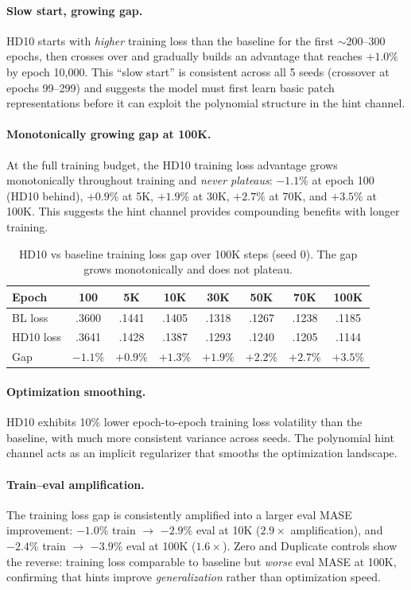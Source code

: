 \documentclass{article}
\begin{document}
\paragraph{Slow start, growing gap.} HD10 starts with \emph{higher} training loss than the baseline for the first $\sim$200--300 epochs, then crosses over and gradually builds an advantage that reaches $+1.0\%$ by epoch 10,000. This ``slow start'' is consistent across all 5 seeds (crossover at epochs 99--299) and suggests the model must first learn basic patch representations before it can exploit the polynomial structure in the hint channel.

\paragraph{Monotonically growing gap at 100K.} At the full training budget, the HD10 training loss advantage grows monotonically throughout training and \emph{never plateaus}: $-1.1\%$ at epoch 100 (HD10 behind), $+0.9\%$ at 5K, $+1.9\%$ at 30K, $+2.7\%$ at 70K, and $+3.5\%$ at 100K. This suggests the hint channel provides compounding benefits with longer training.

\begin{table}[h]
\centering
\caption{HD10 vs baseline training loss gap over 100K steps (seed 0). The gap grows monotonically and does not plateau.}
\small
\begin{tabular}{lccccccc}
\toprule
\textbf{Epoch} & 100 & 5K & 10K & 30K & 50K & 70K & 100K \\
\midrule
BL loss & .3600 & .1441 & .1405 & .1318 & .1267 & .1238 & .1185 \\
HD10 loss & .3641 & .1428 & .1387 & .1293 & .1240 & .1205 & .1144 \\
Gap & $-1.1\%$ & $+0.9\%$ & $+1.3\%$ & $+1.9\%$ & $+2.2\%$ & $+2.7\%$ & $+3.5\%$ \\
\bottomrule
\end{tabular}
\end{table}

\paragraph{Optimization smoothing.} HD10 exhibits 10\% lower epoch-to-epoch training loss volatility than the baseline, with much more consistent variance across seeds. The polynomial hint channel acts as an implicit regularizer that smooths the optimization landscape.

\paragraph{Train--eval amplification.} The training loss gap is consistently amplified into a larger eval MASE improvement: $-1.0\%$ train $\to$ $-2.9\%$ eval at 10K ($2.9\times$ amplification), and $-2.4\%$ train $\to$ $-3.9\%$ eval at 100K ($1.6\times$). Zero and Duplicate controls show the reverse: training loss comparable to baseline but \emph{worse} eval MASE at 100K, confirming that hints improve \emph{generalization} rather than optimization speed.
\end{document}
